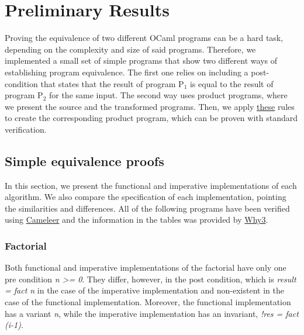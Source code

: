 
%

\chapter{Preliminary Results}
\label{cha:preliminary_results}

Proving the equivalence of two different OCaml programs can be a hard task, depending on the complexity and size of said programs.
Therefore, we implemented a small set of simple programs that show two different ways of establishing program equivalence.
The first one relies on including a post-condition that states that the result of program P$_1$ is equal to the result of program P$_2$ for the same input.
The second way uses product programs, where we present the source and the transformed programs.
Then, we apply \hyperref[fig:product_construction_reduction]{these} rules to create the corresponding product program, which can be proven with standard verification.


\section{Simple equivalence proofs}
\label{sec:results_eq_proofs}

In this section, we present the functional and imperative implementations of each algorithm.
We also compare the specification of each implementation, pointing the similarities and differences.
All of the following programs have been verified using \hyperref[sec:cameleer]{Cameleer} and the information in the tables was provided by \hyperref[sec:why3]{Why3}.


\subsection{Factorial}
\label{sub:factorial}

Both functional and imperative implementations of the factorial have only one pre condition \emph{n >= 0}.
They differ, however, in the post condition, which is \emph{result = fact n} in the case of the imperative implementation and non-existent in the case of the functional implementation.
Moreover, the functional implementation has a variant \emph{n}, while the imperative implementation has an invariant, \emph{!res = fact (i-1)}. 

